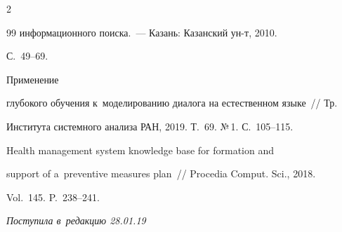 \begin{multicols}{2}
{{\begin{thebibliography}{99}
информационного поиска.~--- Казань: Казанский ун-т, 2010. 


С.~49--69.




   Применение 


глубокого обучения к~моделированию диалога на естественном языке~// Тр. 


Института системного анализа РАН, 2019. Т.~69. №\,1. С.~105--115.




   Health management system knowledge base for formation and 


support of a~preventive measures plan~// Procedia Comput. Sci., 2018. 


Vol.~145. P.~238--241.


  \end{thebibliography}





 }


 }





\end{multicols}





\vspace*{-6pt}





\hfill{\small\textit{Поступила в~редакцию 28.01.19}}















\newpage





\vspace*{-28pt}










